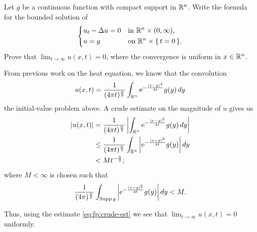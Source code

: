 \begin{problem}
  Let \(g\) be a continuous function with compact support in
  \(\mathbb{R}^n\). Write the formula for the bounded solution of
  \[
    \left\{
      \begin{aligned}
        &u_t-\Delta u=0&&\text{in \(\mathbb{R}^n\times(0,\infty)\),}\\
        &u=g&&\text{on \(\mathbb{R}^n\times\{\,t=0\,\}\).}
      \end{aligned}
    \right.
  \]
  Prove that \(\lim_{t\to\infty} u(x,t)=0\), where the convergence is
  uniform in \(x\in\mathbb{R}^n\).
\end{problem}
\begin{solution*}
  From previous work on the heat equation, we know that the convolution
  \[
    u(x,t)
    =\frac{1}{(4\pi t)^{\frac{n}{2}}}%
    \int_{\R^n}\rme^{-\frac{|x-y|^2}{4t}}g(y)\diff y
  \]
  the initial-value problem above. A crude estimate on the magnitude of
  \(u\) gives us
  \begin{equation}
    \label{eq:fp:crude-est}
    \begin{aligned}
      |u(x,t)| &=%
      \frac{1}{(4\pi t)^{\frac{n}{2}}}%
      \left| \int_{\R^n}\rme^{-\frac{|x-y|^2}{4t}}g(y)\diff y
      \right|\\
      &\leq%
      \frac{1}{(4\pi t)^{\frac{n}{2}}}
      \int_{\R^n}\left|\rme^{-\frac{|x-y|^2}{4t}}g(y)\right|\diff y\\
      &<M t^{-\frac{n}{2}};
    \end{aligned}
  \end{equation}
  where \(M<\infty\) is chosen such that
  \[
    \frac{1}{(4\pi)^{\frac{n}{2}}}
    \int_{\operatorname{Supp} g}\left|\mathrm{e}^{-\frac{|x-y|^2}{4t}}g(y)\right|\mathop{}\!d y
    <M.
  \]

  Thus, using the estimate \eqref{eq:fp:crude-est} we see that
  \(\lim_{t\to\infty}u(x,t)=0\) uniformly.
\end{solution*}

